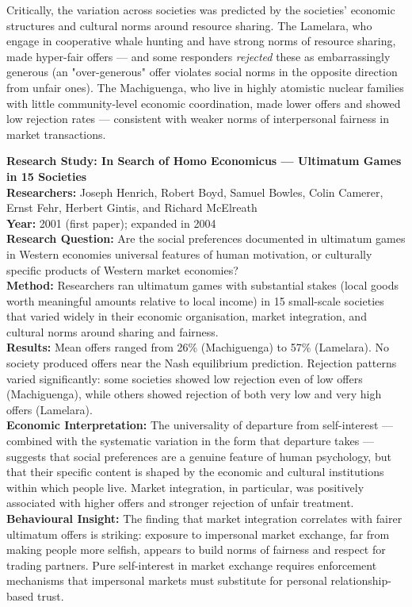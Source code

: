 \documentclass[12pt, letterpaper]{article}
\begin{document}
Critically, the variation across societies was predicted by the societies' economic structures and cultural norms around resource sharing. The Lamelara, who engage in cooperative whale hunting and have strong norms of resource sharing, made hyper-fair offers --- and some responders \textit{rejected} these as embarrassingly generous (an "over-generous" offer violates social norms in the opposite direction from unfair ones). The Machiguenga, who live in highly atomistic nuclear families with little community-level economic coordination, made lower offers and showed low rejection rates --- consistent with weaker norms of interpersonal fairness in market transactions.
\newpage
\begin{researchbox}
\textbf{Research Study: In Search of Homo Economicus --- Ultimatum Games in 15 Societies}\\[4pt]

\textbf{Researchers:} Joseph Henrich, Robert Boyd, Samuel Bowles, Colin Camerer, Ernst Fehr, Herbert Gintis, and Richard McElreath\\[4pt]
\textbf{Year:} 2001 (first paper); expanded in 2004\\[4pt]
\textbf{Research Question:} Are the social preferences documented in ultimatum games in Western economies universal features of human motivation, or culturally specific products of Western market economies?\\[4pt]
\textbf{Method:} Researchers ran ultimatum games with substantial stakes (local goods worth meaningful amounts relative to local income) in 15 small-scale societies that varied widely in their economic organisation, market integration, and cultural norms around sharing and fairness.\\[4pt]
\textbf{Results:} Mean offers ranged from 26\% (Machiguenga) to 57\% (Lamelara). No society produced offers near the Nash equilibrium prediction. Rejection patterns varied significantly: some societies showed low rejection even of low offers (Machiguenga), while others showed rejection of both very low and very high offers (Lamelara).\\[4pt]
\textbf{Economic Interpretation:} The universality of departure from self-interest --- combined with the systematic variation in the form that departure takes --- suggests that social preferences are a genuine feature of human psychology, but that their specific content is shaped by the economic and cultural institutions within which people live. Market integration, in particular, was positively associated with higher offers and stronger rejection of unfair treatment.\\[4pt]
\textbf{Behavioural Insight:} The finding that market integration correlates with fairer ultimatum offers is striking: exposure to impersonal market exchange, far from making people more selfish, appears to build norms of fairness and respect for trading partners. Pure self-interest in market exchange requires enforcement mechanisms that impersonal markets must substitute for personal relationship-based trust.\\[4pt]
\end{researchbox}
\end{document}
